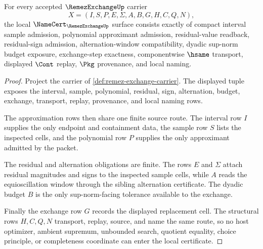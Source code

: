 \begin{theorem}
\label{thm:remez-exchange-namecert-obligations}
For every accepted $\RemezExchangeUp$ carrier
$$
X=(I,S,P,E,\Sigma,A,B,G,H,C,Q,N),
$$
the local $\NameCert_{\RemezExchangeUp}$ surface consists exactly of compact interval sample admission, polynomial approximant admission, residual-value readback, residual-sign admission, alternation-window compatibility, dyadic sup-norm budget exposure, exchange-step exactness, componentwise $\hsame$ transport, displayed $\Cont$ replay, $\Pkg$ provenance, and local naming.
\end{theorem}
\begin{proof}
Project the carrier of \autoref{def:remez-exchange-carrier}. The displayed tuple exposes the interval, sample, polynomial, residual, sign, alternation, budget, exchange, transport, replay, provenance, and local naming rows.

The approximation rows then share one finite source route. The interval row $I$ supplies the only endpoint and containment data, the sample row $S$ lists the inspected cells, and the polynomial row $P$ supplies the only approximant admitted by the packet.

The residual and alternation obligations are finite. The rows $E$ and $\Sigma$ attach residual magnitudes and signs to the inspected sample cells, while $A$ reads the equioscillation window through the sibling alternation certificate. The dyadic budget $B$ is the only sup-norm-facing tolerance available to the exchange.

Finally the exchange row $G$ records the displayed replacement cell. The structural rows $H,C,Q,N$ transport, replay, source, and name the same route, so no host optimizer, ambient supremum, unbounded search, quotient equality, choice principle, or completeness coordinate can enter the local certificate.
\end{proof}


